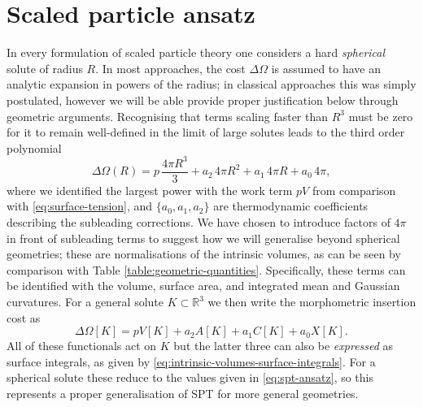 \documentclass[11pt,twoside]{report}
\begin{document}
\section{Scaled particle ansatz}
\label{sec:morphometric-approach}

In every formulation of scaled particle theory one considers a hard \emph{spherical} solute of radius $R$.
In most approaches, the cost $\Delta \Omega$ is assumed to have an analytic expansion in powers of the radius; in classical approaches this was simply postulated, however we will be able provide proper justification below through geometric arguments.
Recognising that terms scaling faster than $R^3$ must be zero for it to remain well-defined in the limit of large solutes leads to the third order polynomial \cite{ReissJCP1959}
\begin{equation}\label{eq:spt-ansatz}
  \Delta\Omega(R) =
  p \, \frac{4\pi R^3}{3} + a_2 \, 4 \pi R^2 + a_1 \, 4 \pi R + a_0 \, 4 \pi,
\end{equation}
where we identified the largest power with the work term $pV$ from comparison with \eqref{eq:surface-tension}, and $\{a_0, a_1, a_2\}$ are thermodynamic coefficients describing the subleading corrections.
We have chosen to introduce factors of $4\pi$ in front of subleading terms to suggest how we will generalise beyond spherical geometries; these are normalisations of the intrinsic volumes, as can be seen by comparison with Table \ref{table:geometric-quantities}.
Specifically, these terms can be identified with the volume, surface area, and integrated mean and Gaussian curvatures.
For a general solute $K \subset \mathbb{R}^3$ we then write the morphometric insertion cost as%
\begin{equation}\label{eq:morph-ansatz}
  \Delta\Omega[K] =
  p V[K]
  + a_2 A[K]
  + a_1 C[K]
  + a_0 X[K].
\end{equation}
All of these functionals act on $K$ but the latter three can also be \emph{expressed} as surface integrals, as given by \eqref{eq:intrinsic-volumes-surface-integrals}.
For a spherical solute these reduce to the values given in \eqref{eq:spt-ansatz}, so this represents a proper generalisation of SPT for more general geometries.
\end{document}

